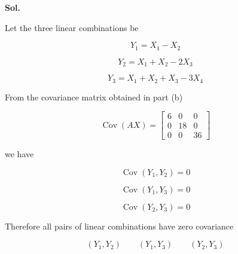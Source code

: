 \documentclass[12pt]{article}
\begin{document}
\noindent
\textbf{Sol.}

\vspace{0.3cm}

\noindent
Let the three linear combinations be

\[
Y_1=X_1-X_2
\]

\[
Y_2=X_1+X_2-2X_3
\]

\[
Y_3=X_1+X_2+X_3-3X_4
\]

\noindent
From the covariance matrix obtained in part (b)

\[
\operatorname{Cov}(AX)
=
\begin{bmatrix}
6 & 0 & 0\\
0 & 18 & 0\\
0 & 0 & 36
\end{bmatrix}
\]

\noindent
we have

\[
\operatorname{Cov}(Y_1,Y_2)=0
\]

\[
\operatorname{Cov}(Y_1,Y_3)=0
\]

\[
\operatorname{Cov}(Y_2,Y_3)=0
\]

\noindent
Therefore all pairs of linear combinations have zero covariance

\[
\boxed{
(Y_1,Y_2)
\qquad
(Y_1,Y_3)
\qquad
(Y_2,Y_3)
}
\]
\end{document}

